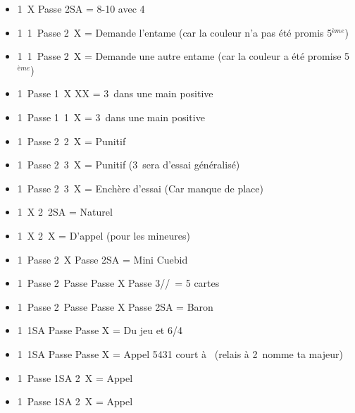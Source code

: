\documentclass[a4paper, oneside, 11pt]{report}
\begin{document}
\newpage
		\begin{itemize}
		\item 1\pique\ X Passe 2SA = 8-10 avec 4\coeur\\
		
		\item 1\trefle\ 1\pique\ Passe 2\trefle\ X = Demande l'entame (car la couleur n'a pas été promis 5$^{ème}$)
		\item 1\coeur\ 1\pique\ Passe 2\coeur\ X = Demande une autre entame (car la couleur a été promise 5$^{ème}$)\\
	
		\item 1\carreau\ Passe 1\coeur\ X XX = 3\coeur\ dans une main positive
		\item 1\carreau\ Passe 1\coeur\ 1\pique\ X = 3\coeur\ dans une main positive
	
		\item 1\coeur\ Passe 2\coeur\ 2\pique\ X = Punitif
		\item 1\coeur\ Passe 2\coeur\ 3\trefle\ X = Punitif (3\carreau\ sera d'essai généralisé)
		\item 1\coeur\ Passe 2\coeur\ 3\carreau\ X = Enchère d'essai (Car manque de place)\\
	
		\item 1\pique\ X 2\pique\ 2SA = Naturel
		\item 1\pique\ X 2\pique\ X = D'appel (pour les mineures)
		\item 1\pique\ Passe 2\pique\ X Passe 2SA = Mini Cuebid
		\item 1\pique\ Passe 2\pique\ Passe Passe X Passe 3\trefle/\carreau/\coeur\ = 5 cartes
		\item 1\pique\ Passe 2\pique\ Passe Passe X Passe 2SA = Baron\\
	
		\item 1\coeur\ 1SA Passe Passe X = Du jeu et 6\coeur/4\pique
		\item 1\trefle\ 1SA Passe Passe X = Appel 5431 court à \carreau\ (relais à 2\carreau\ nomme ta majeur)\\
	
		\item 1\pique\ Passe 1SA 2\carreau\ X = Appel
		\item 1\carreau\ Passe 1SA 2\pique\ X = Appel\\
	

\end{itemize}
\end{document}
